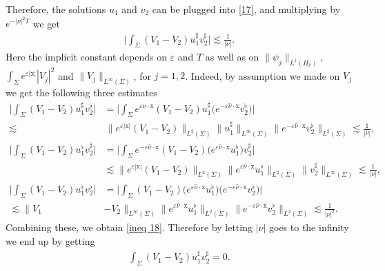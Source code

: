 \documentclass[10pt,a4paper]{amsart}
\theoremstyle{remark}
\theoremstyle{definition}
\newcommand{\x}{\mathrm{x}}
\newcommand{\marnote}[1]{\marginpar{\footnotesize #1}} %
\begin{document}
Therefore, the solutions $u_1$ and $v_2$ can be plugged into \eqref{17}, 
and multiplying by $e^{-|\nu|^2 T}$
 we get 
%
\begin{align}\label{ineq 18}
   \Big| \int_\Sigma   (V_1 - V_2) u_1^\sharp {v_2^\sharp}  \Big|  \lesssim \frac{1}{|\nu|}.
\end{align}
 Here the implicit constant depends on 
$\varepsilon$ and $T$ as well as on $\| \psi_j \|_{L^1(H_{\hat \nu})}$,
$\int_\Sigma e^{ \varepsilon |\x|} |V_j|^2$ and $ \| V_j  \|_{L^\infty(\Sigma)}  $, for $j=1,2$. Indeed, by assumption we made on $V_j$ we get the following three estimates 
\begin{align*}
   \Big| \int_\Sigma   (V_1 - V_2) u_1^\sharp {v_2^\flat} \Big| & =  \Big| \int_\Sigma   e^{\varepsilon \hat{\nu} \cdot \x}(V_1 - V_2) u_1^\sharp \big(e^{- \varepsilon \hat{\nu} \cdot \x}v_2^\flat \big) \Big|  \\
   \lesssim & \, \| e^{\varepsilon | \x|}(V_1 - V_2)  \|_{L^2(\Sigma)} 
   \| u_1^\sharp  \|_{L^\infty(\Sigma)} 
   \| e^{- \varepsilon \hat{\nu} \cdot \x}v_2^\flat   \|_{L^2(\Sigma)} \lesssim \frac{1}{|\nu|}, \\
      \Big| \int_\Sigma   (V_1 - V_2) u_1^\flat {v_2^\sharp}  \Big| &=   \Big| \int_\Sigma   e^{-\varepsilon \hat{\nu} \cdot \x}(V_1 - V_2) \big(e^{\varepsilon \hat{\nu} \cdot \x} u_1^\flat \big) v_2^\sharp  \Big|  \\
   &\lesssim \| e^{\varepsilon | \x|}(V_1 - V_2)  \|_{L^2(\Sigma)}  
   \| e^{\varepsilon \hat{\nu} \cdot \x}u_1^\flat   \|_{L^2(\Sigma)}
    \| v_2^\sharp  \|_{L^\infty(\Sigma)} \lesssim \frac{1}{|\nu|},\\
         \Big| \int_\Sigma   (V_1 - V_2) u_1^\flat {v_2^\flat}  \Big| &=   \Big| \int_\Sigma (V_1 - V_2) \big(e^{\varepsilon \hat{\nu} \cdot \x} u_1^\flat \big)\big(e^{- \varepsilon \hat{\nu} \cdot \x}v_2^\flat \big) \Big|  \\
   \lesssim  \| V_1 &- V_2  \|_{L^\infty(\Sigma)}  
   \| e^{\varepsilon \hat{\nu} \cdot \x}u_1^\flat   \|_{L^2(\Sigma)}
    \| e^{- \varepsilon \hat{\nu} \cdot \x}v_2^\flat \|_{L^2(\Sigma)}\lesssim \frac{1}{|\nu|^2}.
\end{align*}
Combining these, we obtain \eqref{ineq 18}. Therefore by letting $|\nu|$ goes to the infinity we end up by getting
\begin{align}
    \int_\Sigma  (V_1 - V_2) u_1^\sharp {v_2^\sharp}=0.
\end{align}
\end{document}
